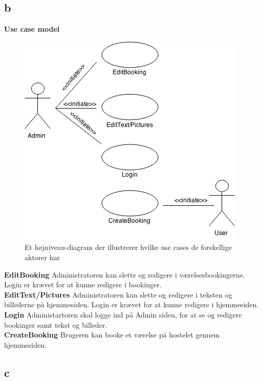 \documentclass[12pt,a4paper]{article}
\begin{document}
\subsection{b}
\textbf{Use case model}
\begin{figure}[H]
\centering
\includegraphics[scale=0.7]{hoejniveau.png}
\caption{Et højniveau-diagram der illustrerer hvilke use cases de forskellige aktører har}
\end{figure}
\textbf{EditBooking}  Administratoren kan slette og redigere i værelsesbookingerne. Login er krævet for at kunne redigere i bookinger.\\
\textbf{EditText/Pictures} Administratoren kan slette og redigere i teksten og billederne på hjemmesiden. Login er krævet for at kunne redigere i hjemmesiden.\\
\textbf{Login} Administartoren skal logge ind på Admin siden, for at se og redigere bookinger samt tekst og billeder.\\
\textbf{CreateBooking} Brugeren kan booke et værelse på hostelet gennem hjemmesiden.\\
\subsection{c}
\end{document}
